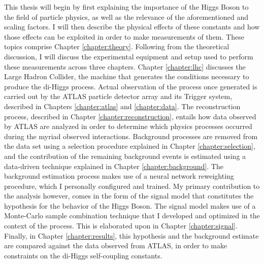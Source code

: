 This thesis will begin by first explaining the importance of the Higgs Boson to the field of particle physics,
    as well as the relevance of the aforementioned \kl and \kvv scaling factors.
I will then describe the physical effects of these constants
    and how those effects can be exploited in order to make measurements of them.
These topics comprise Chapter \ref{chapter:theory}.
Following from the theoretical discussion,
    I will discuss the experimental equipment and setup used to perform these measurements across three chapters.
Chapter \ref{chapter:lhc} discusses the Large Hadron Collider, the machine that generates the conditions necessary to produce the di-Higgs process.
Actual observation of the process once generated is carried out by the ATLAS particle detector array and its Trigger system,
    described in Chapters \ref{chapter:atlas} and \ref{chapter:data}.
The reconstruction process, described in Chapter \ref{chapter:reconstruction},
    entails how data observed by ATLAS are analyzed in order to determine which physics processes occurred during the myriad observed interactions.
Background processes are removed from the data set using a selection procedure explained in Chapter \ref{chapter:selection},
    and the contribution of the remaining background events is estimated using a data-driven technique explained in Chapter \ref{chapter:background}. 
The background estimation process makes use of a neural network reweighting procedure, which I personally configured and trained.
My primary contribution to the analysis however, comes in the form of the signal model that constitutes the hypothesis for the behavior of the Higgs Boson.
The signal model makes use of a Monte-Carlo sample combination technique that I developed and optimized in the context of the \vbfproc process.
This is elaborated upon in Chapter \ref{chapter:signal}.
Finally, in Chapter \ref{chapter:results}, this hypothesis and the background estimate are compared against the data observed from ATLAS,
    in order to make constraints on the di-Higgs self-coupling constants.


